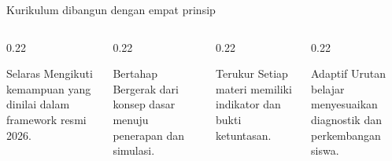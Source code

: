 \begin{frame}{Kurikulum dibangun dengan empat prinsip}
  \begin{columns}[T,onlytextwidth]
    \begin{column}{0.22\textwidth}
      \begin{block}{Selaras}
        Mengikuti kemampuan yang dinilai dalam framework resmi 2026.
      \end{block}
    \end{column}
    \begin{column}{0.22\textwidth}
      \begin{block}{Bertahap}
        Bergerak dari konsep dasar menuju penerapan dan simulasi.
      \end{block}
    \end{column}
    \begin{column}{0.22\textwidth}
      \begin{block}{Terukur}
        Setiap materi memiliki indikator dan bukti ketuntasan.
      \end{block}
    \end{column}
    \begin{column}{0.22\textwidth}
      \begin{block}{Adaptif}
        Urutan belajar menyesuaikan diagnostik dan perkembangan siswa.
      \end{block}
    \end{column}
  \end{columns}
  \vspace{0.28cm}
\end{frame}

